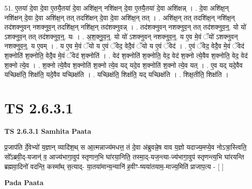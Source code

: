 \documentclass[17pt]{extarticle}
\begin{document}
51. ए॒तया॑ दे॒वा दे॒वा ए॒तयै॒तया॑ दे॒वा अशि॑क्ष॒न् नशि॑क्षन् दे॒वा ए॒तयै॒तया॑ दे॒वा अशि॑क्षन्न् । . दे॒वा अशि॑क्ष॒न् नशि॑क्षन् दे॒वा दे॒वा अशि॑क्ष॒न् तत् तदशि॑क्षन् दे॒वा दे॒वा अशि॑क्ष॒न् तत् । . अशि॑क्ष॒न् तत् तदशि॑क्ष॒न् नशि॑क्ष॒न् तद॑शक्नुवन् नशक्नुव॒न् तदशि॑क्ष॒न् नशि॑क्ष॒न् तद॑शक्नुवन्न् । . तद॑शक्नुवन् नशक्नुव॒न् तत् तद॑शक्नुव॒न्॒. यो यो॑ ऽशक्नुव॒न् तत् तद॑शक्नुव॒न्॒. यः । . अ॒श॒क्नु॒व॒न्॒. यो यो॑ ऽशक्नुवन् नशक्नुव॒न्॒. य ए॒व मे॒वं ॅयो॑ ऽशक्नुवन् नशक्नुव॒न्॒. य ए॒वम् । . य ए॒व मे॒वं ॅयो य ए॒वं ॅवेद॒ वेदै॒वं ॅयो य ए॒वं ॅवेद॑ । . ए॒वं ॅवेद॒ वेदै॒व मे॒वं ॅवेद॑ श॒क्नोति॑ श॒क्नोति॒ वेदै॒व मे॒वं ॅवेद॑ श॒क्नोति॑ । . वेद॑ श॒क्नोति॑ श॒क्नोति॒ वेद॒ वेद॑ श॒क्नो त्ये॒वैव श॒क्नोति॒ वेद॒ वेद॑ श॒क्नो त्ये॒व । . श॒क्नो त्ये॒वैव श॒क्नोति॑ श॒क्नो त्ये॒व यद् यदे॒व श॒क्नोति॑ श॒क्नो त्ये॒व यत् । . ए॒व यद् यदे॒वैव यच्छिक्ष॑ति॒ शिक्ष॑ति॒ यदे॒वैव यच्छिक्ष॑ति । . यच्छिक्ष॑ति॒ शिक्ष॑ति॒ यद् यच्छिक्ष॑ति । . शिक्ष॒तीति॒ शिक्ष॑ति । \newline
\pagebreak
{}

\section{ TS 2.6.3.1 }

\textbf{TS 2.6.3.1 } \newline
\textbf{Samhita Paata} \newline

प्र॒जाप॑ति र्दे॒वेभ्यो॑ य॒ज्ञान् व्यादि॑श॒थ् स आ॒त्मन्नाज्य॑मधत्त॒ तं दे॒वा अ॑ब्रुवन्ने॒ष वाव य॒ज्ञो यदाज्य॒मप्ये॒व नोऽत्रा॒स्त्विति॒ सो᳚ऽब्रवी॒द्-यजान्॑ व॒ आज्य॑भागा॒वुप॑ स्तृणान॒भि घा॑रया॒निति॒ तस्मा॒द्-यज॒न्त्या-ज्य॑भागा॒वुप॑ स्तृणन्त्य॒भि घा॑रयन्ति ब्रह्मवा॒दिनो॑ वदन्ति॒ कस्मा᳚थ् स॒त्याद्- या॒तया॑मान्य॒न्यानि॑ ह॒वीꣳ-ष्यया॑तयाम॒-माज्य॒मिति॑ प्राजाप॒त्य - [  ] \newline

\textbf{Pada Paata} \newline
\end{document}
